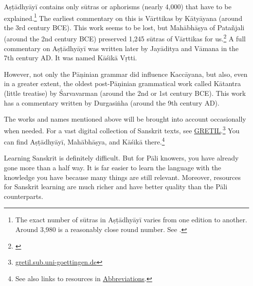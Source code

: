 Aṣṭādhyāyī contains only sūtras or aphorisms (nearly 4,000) that have to be explained.\footnote{The exact number of sūtras in Aṣṭādhyāyī varies from one edition to another. Around 3,980 is a reasonably close round number. See \citealp[pp.~36--37]{deokar:terms}.} The earliest commentary on this is Vārttikas by Kātyāyana (around the 3rd century BCE). This work seems to be lost, but Mahābhāṣya of Patañjali (around the 2nd century BCE) preserved 1,245 sūtras of Vārttikas for us.\footnote{\citealp[p.~426]{keith:history}} A full commentary on Aṣṭādhyāyī was written later by Jayāditya and Vāmana in the 7th century AD. It was named Kāśikā Vṛtti.

However, not only the Pāṇinian grammar did influence Kaccāyana, but also, even in a greater extent, the oldest post-Pāṇinian grammatical work called Kātantra (little treatise) by Śarvavarman (around the 2nd or 1st century BCE). This work has a commentary written by Durgasiṅha (around the 9th century AD).

The works and names mentioned above will be brought into account occasionally when needed. For a vast digital collection of Sanskrit texts, see \href{https://gretil.sub.uni-goettingen.de/}{GRETIL}.\footnote{\url{gretil.sub.uni-goettingen.de}} You can find Aṣṭādhyāyī, Mahābhāṣya, and Kāśikā there.\footnote{See also links to resources in \hyperref[chap:abbrev]{Abbreviations}.}

Learning Sanskrit is definitely difficult. But for Pāli knowers, you have already gone more than a half way. It is far easier to learn the language with the knowledge you have because many things are still relevant. Moreover, resources for Sanskrit learning are much richer and have better quality than the Pāli counterparts.
